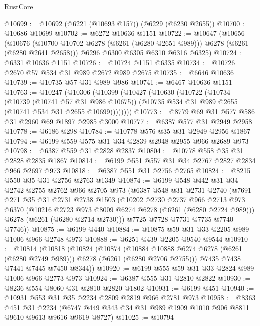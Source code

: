 \begin{lexlean}{RustCore}
\begin{coremodule}
@10699 := @10692 (@6221 (@10693 @157)) (@6229 (@6230 @2655))
@10700 := @10686 @10699
@10702 := @6272 @10636 @1151
@10722 := @10647
    (@10656
      (@10676 (@10700 @10702 @6278 (@6261 (@6280 @2651 @989))) @6278 (@6261 (@6280 @2641 @2658)))
      @6296
      @6300
      @6305
      @6310
      @6316
      @6325)
@10724 := @6331 @10636 @1151
@10726 := @10724 @1151 @6335
@10734 := @10726 @2670 @57 @534 @31 @989 @2672 @989 @2675
@10735 := @6646 @10636
@10739 := @10735 @57 @31 @989 @986
@10741 := @6467 @10636 @1151
@10763 := @10247
    (@10306
      (@10399
        (@10427
          (@10630
            (@10722
              (@10734
                (@10739 (@10741 @57 @31 @986 @10675))
                (@10735 @534 @31 @989 @2655 (@10741 @534 @31 @2655 @10699))))))))
@10773 := @8779 @69 @31 @577 @586 @31 @2960 @69 @1897 @2985 @3000
@10777 := @6387 @577 @31 @2949 @2958
@10778 := @6186 @298
@10784 := @10778 @576 @35 @31 @2949 @2956 @1867
@10794 := @6199 @559 @575 @31 @34 @2839 @2948 @2955 @966 @2689 @973
@10798 := @6387 @559 @31 @2828 @2837
@10804 := @10778 @558 @35 @31 @2828 @2835 @1867
@10814 := @6199 @551 @557 @31 @34 @2767 @2827 @2834 @966 @2697 @973
@10818 := @6387 @551 @31 @2756 @2765
@10824 := @8215 @550 @35 @31 @2756 @2763 @1349
@10874 := @6199
    @548
    @442
    @31
    @34
    @2742
    @2755
    @2762
    @966
    @2705
    @973
    (@6387
      @548
      @31
      @2731
      @2740
      (@7691
        @271
        @35
        @31
        @2731
        @2738
        @1503
        (@10202
          @2730
          @2737
          @966
          @2713
          @973
          @6370
          (@10216 @2723 @973 @8009 @6274 @6278 (@6261 (@6280 @2724 @989)))
          @6278
          (@6261 (@6280 @2714 @2730)))
        @7725
        @7728
        @7731
        @7735
        @7740
        @7746))
@10875 := @6199 @440
@10884 := @10875 @59 @31 @33 @2205 @989 @1006 @966 @2748 @973
@10888 := @6251 @439 @2205 @9540 @9544
@10910 := @10814
    (@10818
      (@10824
        (@10874
          (@10884 @10888 @6274 @6278 (@6261 (@6280 @2749 @989)))
          @6278
          (@6261 (@6280 @2706 @2755)))
        @7435
        @7438
        @7441
        @7445
        @7450
        @8344))
@10920 := @6199 @555 @59 @31 @33 @2824 @989 @1006 @966 @2773 @973
@10924 := @6387 @555 @31 @2810 @2822
@10930 := @8236 @554 @8060 @31 @2810 @2820 @1802
@10931 := @6199 @451
@10940 := @10931 @553 @31 @35 @2234 @2809 @2819 @966 @2781 @973
@10958 := @8363
    @451
    @31
    @2234
    (@6747 @449 @343 @34 @31 @989 @1909 @1010 @906 @8811 @9610 @9613 @9616 @9619 @8727)
@11025 := @10794

\end{coremodule}
\end{lexlean}
